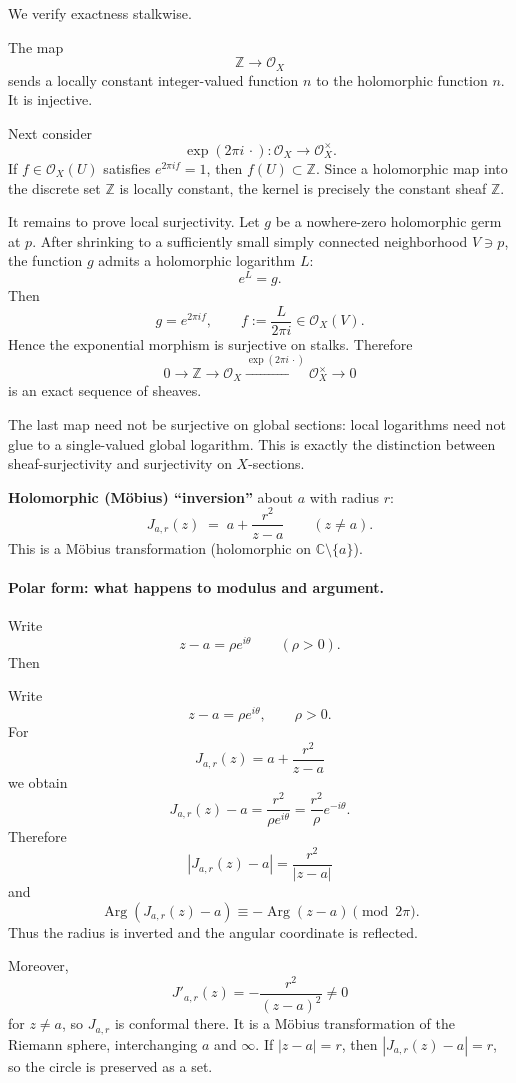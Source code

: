 \begin{solution}
We verify exactness stalkwise.

The map
\[
\mathbb Z \longrightarrow \mathcal O_X
\]
sends a locally constant integer-valued function \(n\) to the holomorphic function \(n\). It is injective.

Next consider
\[
\exp(2\pi i\,\cdot):\mathcal O_X\longrightarrow \mathcal O_X^\times.
\]
If \(f\in\mathcal O_X(U)\) satisfies \(e^{2\pi i f}=1\), then \(f(U)\subset\mathbb Z\). Since a holomorphic map into the discrete set \(\mathbb Z\) is locally constant, the kernel is precisely the constant sheaf \(\mathbb Z\).

It remains to prove local surjectivity. Let \(g\) be a nowhere-zero holomorphic germ at \(p\). After shrinking to a sufficiently small simply connected neighborhood \(V\ni p\), the function \(g\) admits a holomorphic logarithm \(L\):
\[
e^{L}=g.
\]
Then
\[
g=e^{2\pi i f},
\qquad
f:=\frac{L}{2\pi i}\in\mathcal O_X(V).
\]
Hence the exponential morphism is surjective on stalks. Therefore
\[
0\longrightarrow\mathbb Z
\longrightarrow\mathcal O_X
\xrightarrow{\exp(2\pi i\,\cdot)}
\mathcal O_X^\times
\longrightarrow0
\]
is an exact sequence of sheaves.

The last map need not be surjective on global sections: local logarithms need not glue to a single-valued global logarithm. This is exactly the distinction between sheaf-surjectivity and surjectivity on \(X\)-sections.
\end{solution}


\begin{problem}[CP-IV-0014]
\label{prob:cp-iv-0014}
\par\noindent\textbullet\quad \textbf{Holomorphic (Möbius) “inversion”} about $a$ with radius $r$:
	\[
	J_{a,r}(z)\;=\;a+\frac{r^{2}}{z-a}
	\qquad (z\neq a).
	\]
	This is a Möbius transformation (holomorphic on $\mathbb C\setminus\{a\}$).

\paragraph{\textbf{Polar form: what happens to modulus and argument.}}
Write
\[
z-a=\rho e^{i\theta}\qquad(\rho>0).
\]
Then
\end{problem}



\begin{solution}
Write
\[
z-a=\rho e^{i\theta},
\qquad \rho>0.
\]
For
\[
J_{a,r}(z)=a+\frac{r^2}{z-a}
\]
we obtain
\[
J_{a,r}(z)-a
=
\frac{r^2}{\rho e^{i\theta}}
=
\frac{r^2}{\rho}e^{-i\theta}.
\]
Therefore
\[
|J_{a,r}(z)-a|
=
\frac{r^2}{|z-a|}
\]
and
\[
\operatorname{Arg}(J_{a,r}(z)-a)
\equiv
-\operatorname{Arg}(z-a)
\pmod{2\pi}.
\]
Thus the radius is inverted and the angular coordinate is reflected.

Moreover,
\[
J'_{a,r}(z)=-\frac{r^2}{(z-a)^2}\neq0
\]
for \(z\neq a\), so \(J_{a,r}\) is conformal there. It is a M\"obius transformation of the Riemann sphere, interchanging \(a\) and \(\infty\). If \(|z-a|=r\), then \(|J_{a,r}(z)-a|=r\), so the circle is preserved as a set.
\end{solution}



